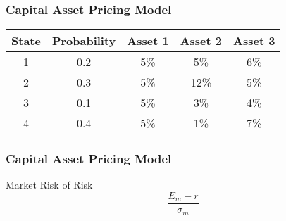 \documentclass{beamer}
\begin{document}
\begin{frame}
\frametitle{Capital Asset Pricing Model}

\begin{tabular}{|c|c|c|c|c|}
		\hline State & Probability & Asset 1  & Asset 2 & Asset 3 \\ 
	\hline 1 & 0.2 & 5\% & 5\% & 6\% \\ 
	\hline 2 & 0.3 & 5\% & 12\% & 5\% \\ 
	\hline 3 & 0.1 & 5\% & 3\% & 4\% \\ 
	\hline 4 & 0.4 & 5\% & 1\% & 7\% \\ 
	\hline 

\end{tabular} 

\end{frame}
\begin{frame}
\frametitle{Capital Asset Pricing Model}
	
	Market Risk of Risk
	\[ \frac{E_m - r}{\sigma_m}\]
	
	
	
\end{frame}
\end{document}
